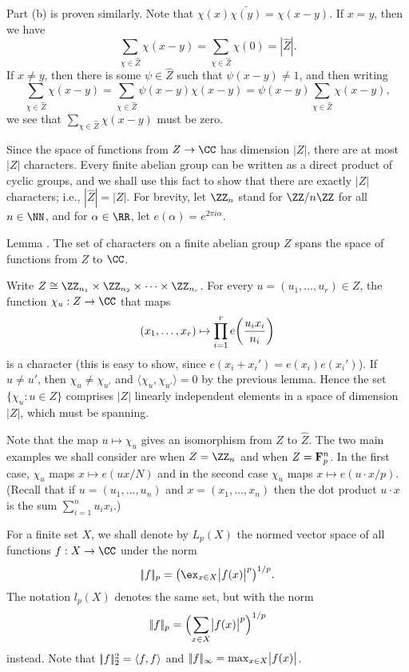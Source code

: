 Part (b) is proven similarly. Note that $\chi(x)\bar{\chi(y)} = \chi(x-y)$. If $x=y$, then we have
$$\sum_{\chi\in\hat Z} \chi(x-y) = \sum_{\chi\in\hat Z} \chi(0) = |\hat Z|.$$
If $x\ne y$, then there is some $\psi\in \hat Z$ such that $\psi(x-y)\ne 1$, and then writing
$$\sum_{\chi\in \hat Z} \chi(x-y) = \sum_{\chi\in\hat Z} \psi(x-y)\chi(x-y)
= \psi(x-y)\sum_{\chi\in\hat Z} \chi(x-y),$$
we see that $\sum_{\chi\in\hat Z} \chi(x-y)$ must be zero.\slug

Since the space of functions from $Z\to \CC$ has dimension $|Z|$, there are at most $|Z|$ characters.
Every finite abelian group can be written as a direct product of cyclic groups, and we shall use this fact
to show that there are exactly $|Z|$ characters; i.e., $|\hat Z| = |Z|$. For brevity, let $\ZZ_n$ stand for $\ZZ/n\ZZ$ for all $n\in\NN$,
and for $\alpha\in \RR$, let $e(\alpha) = e^{2\pi i\alpha}$.

\proclaim Lemma \advthm.
The set of characters on a finite abelian group $Z$ spans the space of functions from $Z$ to $\CC$.

\proof Write $Z \cong \ZZ_{n_1} \times \ZZ_{n_2}\times \cdots\times \ZZ_{n_r}$. For every
$u = (u_1,\ldots, u_r)\in Z$, the function $\chi_u : Z\to \CC$ that maps
$$(x_1,\ldots, x_r) \mapsto \prod_{i=1}^r e\biggl( {u_ix_i\over n_i}\biggr)$$
is a character (this is easy to show, since $e(x_i + x_i') = e(x_i)e(x_i')$). If $u\ne u'$,
then $\chi_u\ne\chi_{u'}$ and $\langle \chi_u,\chi_{u'}\rangle = 0$ by the previous lemma. Hence
the set $\{\chi_u : u\in Z\}$ comprises $|Z|$ linearly independent elements in a space of dimension $|Z|$,
which must be spanning.\slug

Note that the map $u\mapsto \chi_u$ gives an isomorphism from $Z$ to $\hat Z$.
The two main examples we shall consider are when $Z = \ZZ_n$ and when $Z = {\bf F}_p^n$. In the first
case, $\chi_u$ maps $x\mapsto e(ux/N)$ and in the second case $\chi_u$ maps $x\mapsto e(u\cdot x/p)$.
(Recall that if $u = (u_1,\ldots, u_n)$ and $x = (x_1,\ldots, x_n)$ then the dot product $u\cdot x$
is the sum $\sum_{i=1}^n u_ix_i$.)

For a finite set $X$, we shall denote by $L_p(X)$ the normed vector space of all functions $f:X\to \CC$
under the norm
$$\norm{f}_p = \bigl( \ex_{x\in X} \bigl| f(x)\bigr|^p \bigr)^{1/p}.$$
The notation $l_p(X)$ denotes the same set, but with the norm
$$|\!|f|\!|_p = \Bigl( \sum_{x\in X} \bigl| f(x)\bigr|^p \Bigr)^{1/p}$$
instead. Note that $|\!|f|\!|_2^2 = \langle f,f\rangle$ and $|\!|f|\!|_\infty = \max_{x\in X} \bigl|f(x)\bigr|$.

